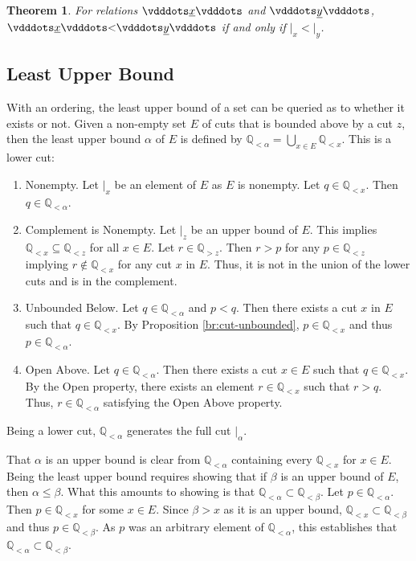 \documentclass[12pt]{article}
\newtheorem{theorem}{Theorem}[section]
\newcommand{\qcut}[2][x]{\ensuremath{\mathbb{Q}_{#2 #1}}}
\newcommand{\qlt}[1][x]{\qcut[#1]{<}}
\newcommand{\qgt}[1][x]{\qcut[#1]{>}}
\newcommand{\cut}[1][x]{{\vert}_{#1} }
\newcommand{\yrel}{\xrel[y]}
\begin{document}
\begin{theorem}
For relations $\xrel$ and $\yrel$, $\xrel < \yrel$ if and only if $\cut < \cut[y]$.
\end{theorem}

\subsection{Least Upper Bound}

With an ordering, the least upper bound of a set can be queried as to whether it exists or not. Given a non-empty set $E$ of cuts that is bounded above by a cut $z$, then the least upper bound $\alpha$ of $E$ is defined by $\qlt[\alpha] = \bigcup_{x \in E} \qlt$. This is a lower cut: 
\begin{enumerate}
    \item Nonempty. Let $\cut$ be an element of $E$ as $E$ is nonempty. Let $q \in \qlt$. Then $q \in \qlt[\alpha]$.
    \item Complement is Nonempty. Let $\cut[z]$ be an upper bound of $E$. This implies $\qlt \subseteq \qlt[z]$ for all $x \in E$. Let $r \in \qgt[z]$. Then $r > p$ for any $p \in \qlt[z]$ implying $r \notin \qlt[x]$ for any cut $x$ in $E$. Thus, it is not in the union of the lower cuts and is in the complement. 
    \item Unbounded Below. Let $q \in \qlt[\alpha]$ and $p < q$. Then there exists a cut $x$ in $E$ such that $q \in \qlt$. By Proposition \ref{br:cut-unbounded}, $p \in \qlt$ and thus $p \in \qlt[\alpha]$.
    \item Open Above. Let $q \in \qlt[\alpha]$. Then there exists a cut $x \in E$ such that $q \in \qlt$. By the Open property, there exists an element $r \in \qlt$ such that $r > q$. Thus, $r \in \qlt[\alpha]$ satisfying the Open Above property. 
\end{enumerate}
Being a lower cut, $\qlt[\alpha]$ generates the full cut $\cut[\alpha]$.

That $\alpha$ is an upper bound is clear from $\qlt[\alpha]$ containing every $\qlt$ for $x \in E$. Being the least upper bound requires showing that if $\beta$ is an upper bound of $E$, then $\alpha \leq \beta$. What this amounts to showing is that $\qlt[\alpha] \subset \qlt[\beta]$. Let $p \in \qlt[\alpha]$. Then $p \in \qlt$ for some $x \in E$. Since $\beta > x$ as it is an upper bound, $\qlt \subset \qlt[\beta]$ and thus $p \in \qlt[\beta]$. As $p$ was an arbitrary element of $\qlt[\alpha]$, this  establishes that $\qlt[\alpha] \subset \qlt[\beta]$.
\end{document}
